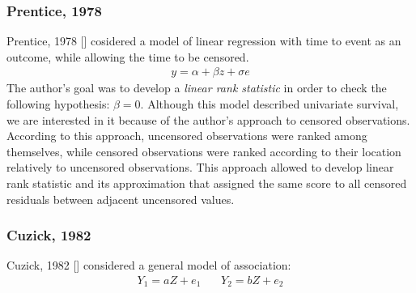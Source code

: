 \documentclass[]{article}
\begin{document}
\subsubsection{Prentice, 1978}
Prentice, 1978 [\cite{prentice1978linear}] cosidered a model of linear regression with time to event as an outcome, while allowing the time to be censored.
	$$
	\begin{aligned}
		y = \alpha + \beta z + \sigma e
	\end{aligned}
	$$
The author's goal was to develop a \emph{linear rank statistic} in order to check the following hypothesis: $\beta = 0$. Although this model described univariate survival, we are interested in it because of the author's approach to censored observations. 
According to this approach, uncensored observations were ranked among themselves, while censored observations were ranked according to their location relatively to uncensored observations. This approach allowed to develop linear rank statistic and its approximation that assigned the same score to all censored residuals between adjacent uncensored values.

\subsubsection{Cuzick, 1982}
Cuzick, 1982 [\cite{cuzick1982rank}] considered a general model of association:
	$$
	\begin{aligned}
		Y_1 = aZ + e_1 ~~~~~~~~ Y_2 = bZ + e_2
	\end{aligned}
	$$
\end{document}
